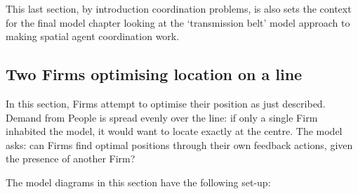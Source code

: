 This last section, by introduction coordination problems, is also sets the context for the final model chapter looking at the `transmission belt' model approach to making spatial agent coordination work.

\subsection{Two Firms optimising location on a line \label{sec:hotellingesque}}

In this section, Firms attempt to optimise their position as just described. Demand from People is spread evenly over the line: if only a single Firm inhabited the model, it would want to locate exactly at the centre. The model asks: can Firms find optimal positions through their own feedback actions, given the presence of another Firm? 

The model diagrams in this section have the following set-up:

